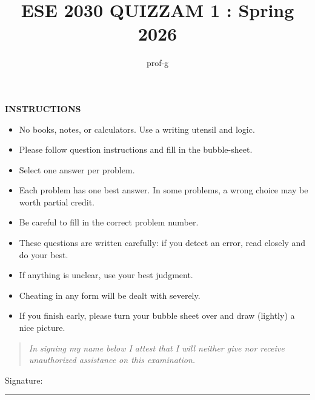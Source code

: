 \documentclass[12pt]{amsart}
\title{ESE 2030 QUIZZAM 1 : Spring 2026}
\author{prof-g}
\begin{document}
\thispagestyle{firstpage}

\maketitle

\begin{center}
    {\bf INSTRUCTIONS}
\end{center}

\begin{itemize}
\item 
No books, notes, or calculators. Use a writing utensil and logic. 

\item 
Please follow question instructions and fill in the bubble-sheet. 

\item 
Select one answer per problem.

\item 
Each problem has one best answer. In some problems, a wrong choice may be worth partial credit. 

\item 
Be careful to fill in the correct problem number. 

\item 
These questions are written carefully: if you detect an error, read closely and do your best.

\item 
If anything is unclear, use your best judgment. 

\item 
Cheating in any form will be dealt with severely. 

\item 
If you finish early, please turn your bubble sheet over and draw (lightly) a nice picture. 

\end{itemize}

\vspace{1in}
\begin{center}
\begin{quote}
    \large
{\em In signing my name below I attest that I will neither give nor receive unauthorized assistance on this examination.}
    \normalsize
\end{quote}
\vspace{1in}

Signature: \rule{3in}{0.4pt}
\end{center}
\newpage
\end{document}
